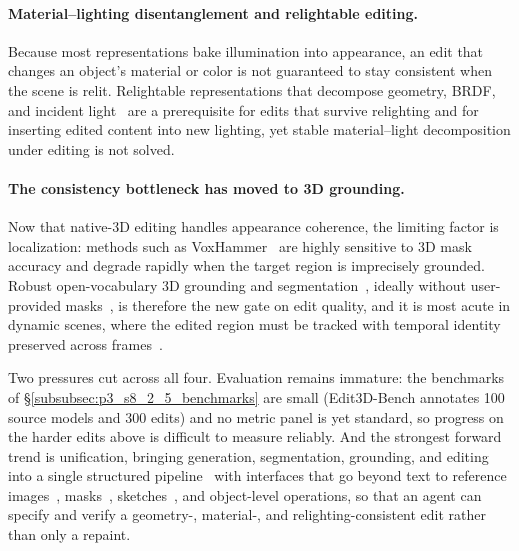 \paragraph{Material--lighting disentanglement and relightable editing.}
Because most representations bake illumination into appearance, an edit that changes an object's material or color is not guaranteed to stay consistent when the scene is relit. Relightable representations that decompose geometry, BRDF, and incident light~\cite{gao2024relightable} are a prerequisite for edits that survive relighting and for inserting edited content into new lighting, yet stable material--light decomposition under editing is not solved.

\paragraph{The consistency bottleneck has moved to 3D grounding.}
Now that native-3D editing handles appearance coherence, the limiting factor is localization: methods such as VoxHammer~\cite{li2025voxhammer} are highly sensitive to 3D mask accuracy and degrade rapidly when the target region is imprecisely grounded. Robust open-vocabulary 3D grounding and segmentation~\cite{hu2024semanticanythinggaussians,cen2025segmentany3dgaussians}, ideally without user-provided masks~\cite{xia2025towardsConsistent}, is therefore the new gate on edit quality, and it is most acute in dynamic scenes, where the edited region must be tracked with temporal identity preserved across frames~\cite{he2025ctrld}.

Two pressures cut across all four. Evaluation remains immature: the benchmarks of §\ref{subsubsec:p3_s8_2_5_benchmarks} are small (Edit3D-Bench annotates 100 source models and 300 edits) and no metric panel is yet standard, so progress on the harder edits above is difficult to measure reliably. And the strongest forward trend is unification, bringing generation, segmentation, grounding, and editing into a single structured pipeline~\cite{park2026generative} with interfaces that go beyond text to reference images~\cite{shu2025gaussedit}, masks~\cite{barda2025instant3dit}, sketches~\cite{mikaeili2023sked}, and object-level operations, so that an agent can specify and verify a geometry-, material-, and relighting-consistent edit rather than only a repaint.

